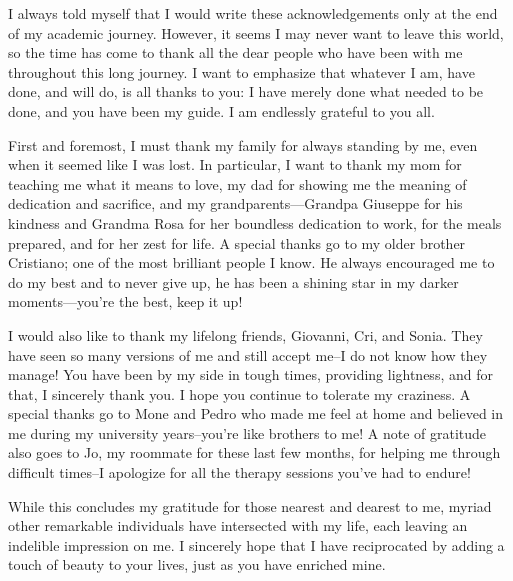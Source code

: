 I always told myself that I would write these acknowledgements only at the end of my academic journey.
 However, it seems I may never want to leave this world, 
 so the time has come to thank all the dear people who have been with me throughout this long journey. 
 I want to emphasize that whatever I am, have done, and will do, is all thanks to you: 
 I have merely done what needed to be done, and you have been my guide. 
 I am endlessly grateful to you all.

First and foremost, 
 I must thank my family for always standing by me, 
 even when it seemed like I was lost. 
 In particular, I want to thank my mom for teaching me what it means to love, 
 my dad for showing me the meaning of dedication and sacrifice, 
 and my grandparents—Grandpa Giuseppe for his kindness and Grandma Rosa for her boundless dedication to work, for the meals prepared, and for her zest for life. 
 A special thanks go to my older brother Cristiano; 
 one of the most brilliant people I know.
 He always encouraged me to do my best and to never give up, 
 he has been a shining star in my darker moments—you're the best, keep it up!

I would also like to thank my lifelong friends, 
 Giovanni, Cri, and Sonia. 
 They have seen so many versions of me and still accept me--I do not know how they manage! 
 You have been by my side in tough times, providing lightness, and for that, I sincerely thank you. 
 I hope you continue to tolerate my craziness.
%
A special thanks go to Mone and Pedro who made me feel at home and believed in me during my university years--you're like brothers to me! 
%
A note of gratitude also goes to Jo, 
 my roommate for these last few months, 
 for helping me through difficult times--I apologize for all the therapy sessions you've had to endure!
%
\begin{comment}
    Last but not least, I want to thank Marta—my muse, my reference point, and my best friend. Much of who I am today is thanks to her. I'm still not as radiant as I'd like to be, but some of the light I do have comes from the years spent with her. Thank you for everything.
    A special thanks to my second family, the Luffarelli--thank you for loving me as a son. You will forever be in my heart.
\end{comment}
While this concludes my gratitude for those nearest and dearest to me, 
 myriad other remarkable individuals have intersected with my life, 
 each leaving an indelible impression on me. 
 I sincerely hope that I have reciprocated by adding a touch of beauty to your lives, 
 just as you have enriched mine.

